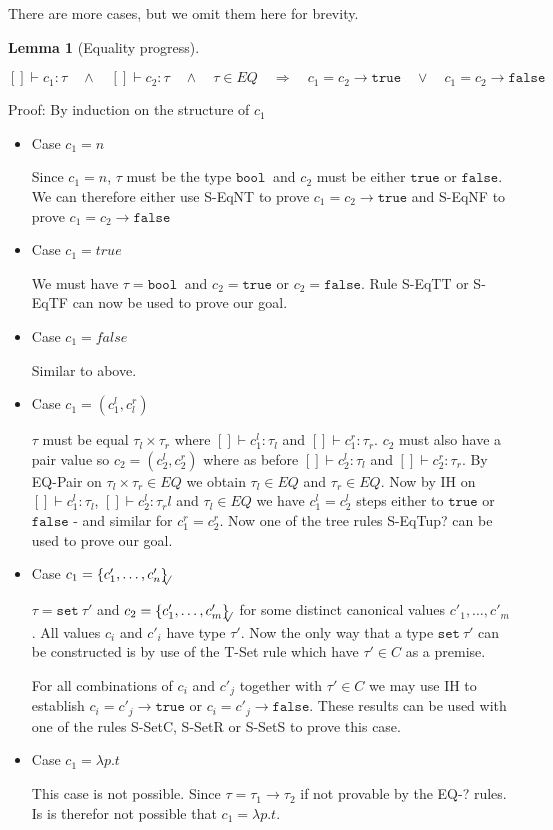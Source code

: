 \documentclass[a4paper]{article}
\newcommand{\s}[1]{\mathtt{#1}}
\newcommand{\sLb}{\s{\{}}
\newcommand{\sRb}{\s{\}}}
\newcommand{\sbool}{\s{bool\ }}
\newcommand{\sseta}{\s{set\ }}
\newcommand{\strue}{\s{true}}
\newcommand{\sfalse}{\s{false}}
\newcommand{\sset}[1]{\sLb #1 \sRb}
\newcommand{\ssetc}[1]{\sset{#1}_{\!\!\!\surd}}
\newcommand{\im}{\Rightarrow}
\newcommand{\step}{\to}
\newtheorem{lemma}{Lemma}[section]
\begin{document}
There are more cases, but
we omit them
here for brevity.




\begin{lemma}[Equality progress] $ $
  \label{lemma:equalityProgress}

$[]\vdash c_1:\tau \quad \land \quad []\vdash c_2:\tau \quad \land \quad \tau \in EQ \quad \im \quad
c_1 = c_2 \step \strue \quad \lor \quad c_1 = c_2 \step \sfalse$
\end{lemma}

Proof: By induction on the structure of $c_1$
\begin{itemize}
\item Case $c_1 = n$

Since $c_1 = n$, $\tau$ must be the type $\sbool$ and $c_2$ must be either $\strue$ or $\sfalse$. We can therefore either use S-EqNT to prove $c_1 = c_2 \step \strue$ and S-EqNF to prove $c_1 = c_2 \step \sfalse$

\item Case $c_1 = true$

We must have $\tau = \sbool$ and $c_2 = \strue$ or $c_2 = \sfalse$. Rule S-EqTT or S-EqTF can now be used to prove our goal.

\item Case $c_1 = false$

Similar to above.

\item Case $c_1 = (c_1^l, c_l^r)$

$\tau$ must be equal $\tau_l \times \tau_r$ where $[]\vdash c_1^l:\tau_l$ and $[]\vdash c_1^r:\tau_r$. $c_2$ must also have a pair value so $c_2 = (c_2^l, c_2^r)$ where as before $[]\vdash c_2^l:\tau_l$ and $[]\vdash c_2^r:\tau_r$. By EQ-Pair on $\tau_l \times \tau_r \in EQ$ we obtain $\tau_l \in EQ$ and $\tau_r \in EQ$. Now by IH on $[]\vdash c_1^l:\tau_l$, $[]\vdash c_2^l:\tau_rl$ and $\tau_l \in EQ$ we have $c_1^l = c_2^l$ steps either to $\strue$ or $\sfalse$ - and similar for $c_1^r = c_2^r$. Now one of the tree rules S-EqTup? can be used to prove our goal.

\item Case $c_1 = \ssetc{c'_1,\ldots,c'_n}$

$\tau = \sseta \tau'$ and $c_2 = \ssetc{c'_1,\ldots,c'_m}$ for some distinct canonical values $c'_1,\ldots,c'_m$. All values $c_i$ and $c'_i$ have type $\tau'$. Now the only way that a type $\sseta \tau'$ can be constructed is by use of the T-Set rule which have $\tau' \in C$ as a premise.

For all combinations of $c_i$ and $c'_j$ together with $\tau' \in C$ we may use IH to establish $c_i = c'_j \step \strue$ or $c_i = c'_j \step \sfalse$. These results can be used with one of the rules S-SetC, S-SetR or S-SetS to prove this case.

\item Case $c_1 = \lambda p.t$

This case is not possible. Since $\tau = \tau_1 \to \tau_2$ if not provable by the EQ-? rules. Is is therefor not possible that $c_1 = \lambda p.t$.
\end{itemize}
\end{document}

